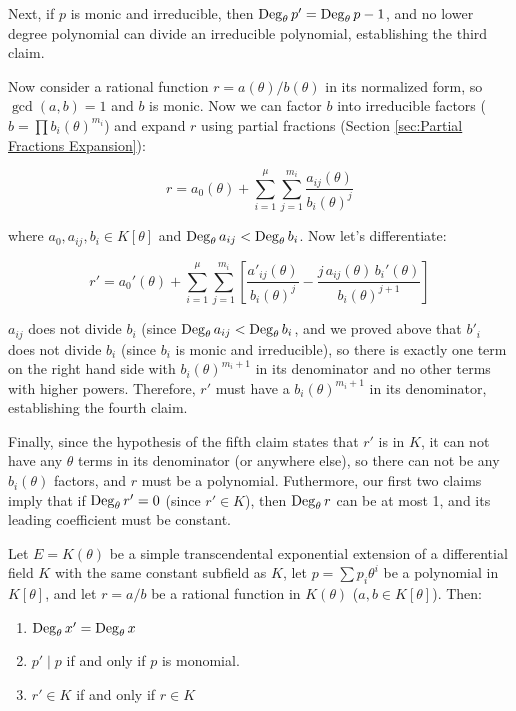 Next, if $p$ is monic and irreducible, then ${\rm Deg}_\theta\, p' =
{\rm Deg}_\theta\, p - 1$, and no lower degree polynomial can divide
an irreducible polynomial, establishing the third claim.

Now consider a rational function $r=a(\theta)/b(\theta)$ in its
normalized form, so $\gcd(a,b) = 1$ and $b$ is monic.  Now we can
factor $b$ into irreducible factors ($b=\prod b_i(\theta)^{m_i}$) and
expand $r$ using partial fractions (Section \ref{sec:Partial Fractions
Expansion}):

$$r = a_0(\theta) + \sum_{i=1}^\mu \sum_{j=1}^{m_i} \frac{a_{ij}(\theta)}{b_i(\theta)^j}$$

where $a_0, a_{ij}, b_i \in K[\theta]$ and ${\rm Deg}_\theta\, a_{ij} < {\rm
Deg}_\theta\, b_i$.  Now let's differentiate:

$$r' = a_0'(\theta) + \sum_{i=1}^\mu \sum_{j=1}^{m_i} \left[
\frac{a'_{ij}(\theta)}{b_i(\theta)^j} - \frac{j\, a_{ij}(\theta)\,
b_i'(\theta)}{b_i(\theta)^{j+1}} \right]$$

$a_{ij}$ does not divide $b_i$ (since ${\rm Deg}_\theta\, a_{ij} <
{\rm Deg}_\theta\, b_i$, and we proved above that $b'_i$ does not
divide $b_i$ (since $b_i$ is monic and irreducible), so there is
exactly one term on the right hand side with $b_i(\theta)^{m_i + 1}$
in its denominator and no other terms with higher powers.  Therefore,
$r'$ must have a $b_i(\theta)^{m_i +1}$ in its denominator, establishing
the fourth claim.

Finally, since the hypothesis of the fifth claim states that $r'$ is in
$K$, it can not have any $\theta$ terms in its denominator (or
anywhere else), so there can not be any $b_i(\theta)$ factors, and $r$
must be a polynomial.  Futhermore, our first two claims imply that if
${\rm Deg}_\theta\, r' = 0$ (since $r'\in K$), then ${\rm
Deg}_\theta\, r$ can be at most 1, and its leading coefficient must be
constant.

\endtheorem

\theorem\label{basic exponential properties}
Let $E=K(\theta)$ be a simple transcendental exponential extension of
a differential field $K$ with the same constant subfield as $K$,
let $p=\sum p_i \theta^i$ be a polynomial in $K[\theta]$,
and let $r=a/b$ be a rational function in $K(\theta)$
($a, b \in K[\theta]$).  Then:

\begin{enumerate}
\item ${\rm Deg}_\theta\, x' = {\rm Deg}_\theta\, x$
\item $p' \mid p$ if and only if $p$ is monomial.
\item $r' \in K$ if and only if $r \in K$
\end{enumerate}

